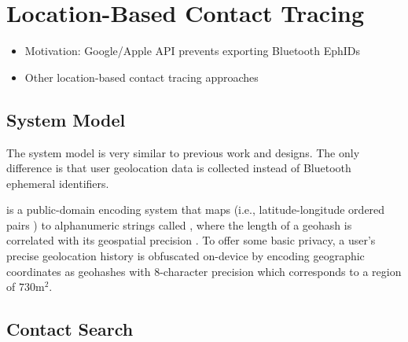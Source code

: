 \section{Location-Based Contact Tracing}\label{sec:location-based}
\begin{itemize}
  \item Motivation: Google/Apple API prevents exporting Bluetooth EphIDs
  \item Other location-based contact tracing approaches
\end{itemize}
\subsection{System Model}
The system model is very similar to previous work \cite{Ayday2020, Ayday2021} and designs. The only difference is that user geolocation data is collected instead of Bluetooth ephemeral identifiers.

 is a public-domain encoding system that maps  (i.e., latitude-longitude ordered pairs \cite[p. 5]{Sickle2004}) to alphanumeric strings called , where the length of a geohash is correlated with its geospatial precision \cite{Morton1966}. To offer some basic privacy, a user's precise geolocation history is obfuscated on-device by encoding geographic coordinates as geohashes with 8-character precision which corresponds to a region of $730\mathrm{m}^2$.

\subsection{Contact Search}

\newcommand{\histories}{\vSet{H}}
\newcommand{\locations}{\mathbb{L}}
\newcommand{\locset}{\vSet{L}}
\newcommand{\latitude}{\phi}
\newcommand{\longitude}{\lambda}
\newcommand{\users}{\vSet{U}}
\newcommand{\sindex}{\vSet{I}}
\newcommand{\query}{\vSet{N}}
\newcommand{\qelement}{q}
\newcommand{\hone}{G}
\newcommand{\htwo}{H}
\newcommand{\neighbors}{\vSet{N}}

